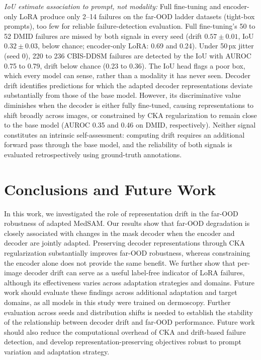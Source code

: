\documentclass[runningheads]{llncs}
\begin{document}
\emph{IoU estimate association to prompt, not modality:} Full fine-tuning and encoder-only LoRA produce only 2--14 failures on the far-OOD ladder datasets (tight-box prompts), too few for reliable failure-detection evaluation. Full fine-tuning's 50 to 52 DMID failures are missed by both signals in every seed (drift $0.57 \pm 0.01$, IoU $0.32 \pm 0.03$, below chance; encoder-only LoRA: 0.69 and 0.24). Under 50\,px jitter (seed 0), 220 to 236 CBIS-DDSM failures are detected by the IoU with AUROC 0.75 to 0.79, drift below chance (0.23 to 0.36). The IoU head flags a poor box, which every model can sense, rather than a modality it has never seen. Decoder drift identifies predictions for which the adapted decoder representations deviate substantially from those of the base model. However, its discriminative value diminishes when the decoder is either fully fine-tuned, causing representations to shift broadly across images, or constrained by CKA regularization to remain close to the base model (AUROC 0.35 and 0.46 on DMID, respectively). Neither signal constitutes an intrinsic self-assessment: computing drift requires an additional forward pass through the base model, and the reliability of both signals is evaluated retrospectively using ground-truth annotations.

\section{Conclusions and Future Work}
\label{sec:conclusion}

In this work, we investigated the role of representation drift in the far-OOD robustness of adapted MedSAM. Our results show that far-OOD degradation is closely associated with changes in the mask decoder when the encoder and decoder are jointly adapted. Preserving decoder representations through CKA regularization substantially improves far-OOD robustness, whereas constraining the encoder alone does not provide the same benefit. We further show that per-image decoder drift can serve as a useful label-free indicator of LoRA failures, although its effectiveness varies across adaptation strategies and domains. Future work should evaluate these findings across additional adaptation and target domains, as all models in this study were trained on dermoscopy. Further evaluation across seeds and distribution shifts is needed to establish the stability of the relationship between decoder drift and far-OOD performance. Future work should also reduce the computational overhead of CKA and drift-based failure detection, and develop representation-preserving objectives robust to prompt variation and adaptation strategy.



\end{document}
